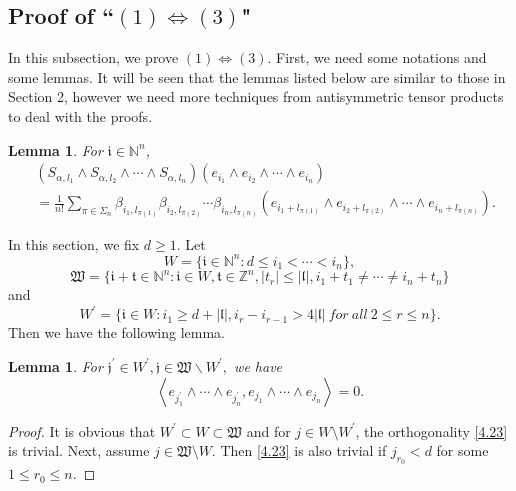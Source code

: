 \documentclass[11pt]{article}
\theoremstyle{plain}
\newtheorem{lem}[thm]{Lemma}
\theoremstyle{definition}
\begin{document}
{\subsection{Proof of ``$(1)\Leftrightarrow (3)$"}%
In this subsection, we prove $(1)\Leftrightarrow (3)$. First, we need some notations and some lemmas. It will be seen that the lemmas listed below are similar to those in Section 2, however we need more techniques from antisymmetric tensor products to deal with the proofs. 
\begin{lem}\label{lemA2.1}
	For $\mathfrak{i}\in\mathbb N^n$,
	$$\begin{aligned}
		& \left ( S_{\alpha,{l_{1}}}\wedge S_{\alpha,{l_{2}}}\wedge \cdots \wedge S_{\alpha,{l_{n}}}  \right ) \left ( e_{i_{1} }\wedge e_{i_{2} }\wedge\cdots \wedge e_{i_{n} }    \right ) 
		\\ &=\frac{1}{n!} \sum\limits_{\pi  \in \Sigma _{n} }\beta_{i_{1},l_{\pi  (1)}} \beta_{i_{2},l_{\pi  (2)}}\cdots\beta_{i_{n},l_{\pi  (n)}} \left (  e_{i_{1}+l_{\pi  (1)} }\wedge e_{i_{2}+l_{\pi  (2)} }\wedge \cdots \wedge e_{i_{n} +l_{\pi  (n)}} \right ). 
	\end{aligned}$$
\end{lem}
In this section, we fix $d\geq 1.$ 
Let \begin{equation}\label{wdef}W=\{  \mathfrak{i} \in\mathbb N^n: d\leq i_1< \cdots < i_n\},\end{equation}
$$\mathfrak{W}=\{ \mathfrak{i}+\mathfrak{t} \in\mathbb N^n: \mathfrak{i} \in W, \mathfrak{t} \in\mathbb Z^n, |t_r|\leq |\mathfrak{l}|, i_1+t_{1}\neq\cdots \neq i_n+t_{n}\}$$
and
$$W^{\prime}=\{  \mathfrak{i} \in W: i_1\geq d+|\mathfrak{l}|, i_r- i_{r-1}> 4 |\mathfrak{l}| ~for~all~ 2\leq r\leq n\}.$$
Then we have the following lemma.
\begin{lem}\label{lemma3.2}
For $\mathfrak{j}^{\prime}\in W^{\prime}, \mathfrak{j} \in \mathfrak{W}\backslash W^{\prime},$ we have
 \begin{equation}\label{4.23}\left\langle e_{j_1^{\prime}} \wedge \cdots \wedge e_{j_n^{\prime}}, e_{j_1} \wedge \cdots \wedge e_{j_n}\right\rangle =0.\end{equation} 
\end{lem}
\begin{proof}
It is obvious that $W^\prime\subset W\subset\mathfrak{W}$ and for $j\in W\setminus W^\prime$, the orthogonality \eqref{4.23} is trivial. Next, assume $j\in \mathfrak{W}\setminus W$. Then \eqref{4.23} is also trivial if $j_{r_0}  <  d$ for some $1\leq r_0\leq n$. 


\end{proof}}
\end{document}
